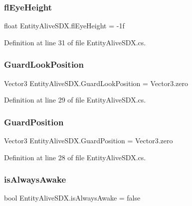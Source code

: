 \subsubsection{\texorpdfstring{flEyeHeight}{flEyeHeight}}
{\footnotesize\ttfamily float Entity\+Alive\+S\+D\+X.\+fl\+Eye\+Height = -\/1f}



Definition at line 31 of file Entity\+Alive\+S\+D\+X.\+cs.

\mbox{\label{class_entity_alive_s_d_x_ab664e0ce5fd1280cc7eeb1dfe4d4bc3e}} 
\subsubsection{\texorpdfstring{GuardLookPosition}{GuardLookPosition}}
{\footnotesize\ttfamily Vector3 Entity\+Alive\+S\+D\+X.\+Guard\+Look\+Position = Vector3.\+zero}



Definition at line 29 of file Entity\+Alive\+S\+D\+X.\+cs.

\mbox{\label{class_entity_alive_s_d_x_a7e6fe86e67d1e8e7b7fb308cae888e07}} 
\subsubsection{\texorpdfstring{GuardPosition}{GuardPosition}}
{\footnotesize\ttfamily Vector3 Entity\+Alive\+S\+D\+X.\+Guard\+Position = Vector3.\+zero}



Definition at line 28 of file Entity\+Alive\+S\+D\+X.\+cs.

\mbox{\label{class_entity_alive_s_d_x_adc7bfe742d0a4841d5c8cc0943026977}} 
\subsubsection{\texorpdfstring{isAlwaysAwake}{isAlwaysAwake}}
{\footnotesize\ttfamily bool Entity\+Alive\+S\+D\+X.\+is\+Always\+Awake = false}



